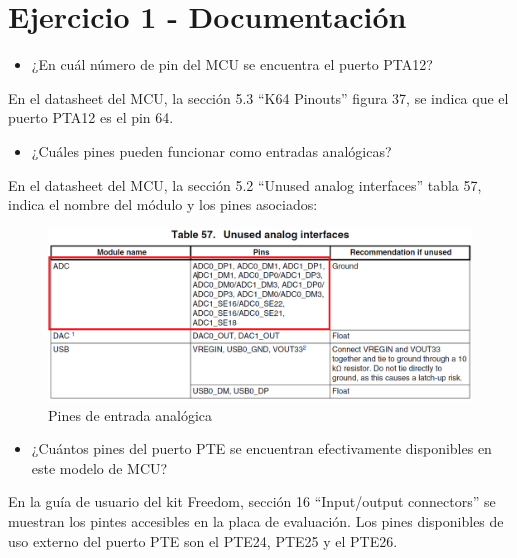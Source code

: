\documentclass{article}
\begin{document}
\newgeometry{} %



\tableofcontents
\newpage

\section*{Ejercicio 1 - Documentación}

\begin{itemize}
\item ¿En cuál número de pin del MCU se encuentra el puerto PTA12?
\end{itemize}
En el datasheet del MCU, la sección 5.3 ``K64 Pinouts'' figura 37, se indica que el puerto PTA12 es el pin 64.

\begin{itemize}
\item ¿Cuáles pines pueden funcionar como entradas analógicas?
\end{itemize}
En el datasheet del MCU, la sección 5.2 ``Unused analog interfaces'' tabla 57, indica el nombre del módulo y los pines asociados:

\begin{figure}[ht]
	\centering
	\includegraphics[width=0.8 \textwidth]
	{../Imagenes/TablaADC.png}
	\caption{Pines de entrada analógica}
	\label{fig:ej1}
\end{figure}

\begin{itemize}
\item ¿Cuántos pines del puerto PTE se encuentran efectivamente disponibles en este modelo de MCU?
\end{itemize}
En la guía de usuario del kit Freedom, sección 16 ``Input/output connectors'' se muestran los pintes accesibles en la placa de evaluación. Los pines disponibles de uso externo del puerto PTE son el PTE24, PTE25 y el PTE26.
\end{document}
